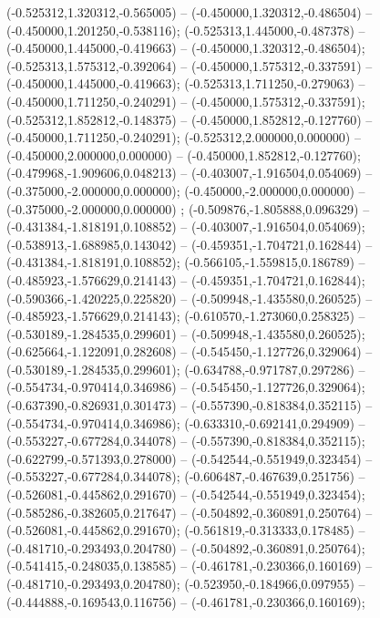  (-0.525312,1.320312,-0.565005) -- (-0.450000,1.320312,-0.486504) -- (-0.450000,1.201250,-0.538116);
 (-0.525313,1.445000,-0.487378) -- (-0.450000,1.445000,-0.419663) -- (-0.450000,1.320312,-0.486504);
 (-0.525313,1.575312,-0.392064) -- (-0.450000,1.575312,-0.337591) -- (-0.450000,1.445000,-0.419663);
 (-0.525313,1.711250,-0.279063) -- (-0.450000,1.711250,-0.240291) -- (-0.450000,1.575312,-0.337591);
 (-0.525312,1.852812,-0.148375) -- (-0.450000,1.852812,-0.127760) -- (-0.450000,1.711250,-0.240291);
 (-0.525312,2.000000,0.000000) -- (-0.450000,2.000000,0.000000) -- (-0.450000,1.852812,-0.127760);
 (-0.479968,-1.909606,0.048213) -- (-0.403007,-1.916504,0.054069) -- (-0.375000,-2.000000,0.000000);
 (-0.450000,-2.000000,0.000000) -- (-0.375000,-2.000000,0.000000) ;
 (-0.509876,-1.805888,0.096329) -- (-0.431384,-1.818191,0.108852) -- (-0.403007,-1.916504,0.054069);
 (-0.538913,-1.688985,0.143042) -- (-0.459351,-1.704721,0.162844) -- (-0.431384,-1.818191,0.108852);
 (-0.566105,-1.559815,0.186789) -- (-0.485923,-1.576629,0.214143) -- (-0.459351,-1.704721,0.162844);
 (-0.590366,-1.420225,0.225820) -- (-0.509948,-1.435580,0.260525) -- (-0.485923,-1.576629,0.214143);
 (-0.610570,-1.273060,0.258325) -- (-0.530189,-1.284535,0.299601) -- (-0.509948,-1.435580,0.260525);
 (-0.625664,-1.122091,0.282608) -- (-0.545450,-1.127726,0.329064) -- (-0.530189,-1.284535,0.299601);
 (-0.634788,-0.971787,0.297286) -- (-0.554734,-0.970414,0.346986) -- (-0.545450,-1.127726,0.329064);
 (-0.637390,-0.826931,0.301473) -- (-0.557390,-0.818384,0.352115) -- (-0.554734,-0.970414,0.346986);
 (-0.633310,-0.692141,0.294909) -- (-0.553227,-0.677284,0.344078) -- (-0.557390,-0.818384,0.352115);
 (-0.622799,-0.571393,0.278000) -- (-0.542544,-0.551949,0.323454) -- (-0.553227,-0.677284,0.344078);
 (-0.606487,-0.467639,0.251756) -- (-0.526081,-0.445862,0.291670) -- (-0.542544,-0.551949,0.323454);
 (-0.585286,-0.382605,0.217647) -- (-0.504892,-0.360891,0.250764) -- (-0.526081,-0.445862,0.291670);
 (-0.561819,-0.313333,0.178485) -- (-0.481710,-0.293493,0.204780) -- (-0.504892,-0.360891,0.250764);
 (-0.541415,-0.248035,0.138585) -- (-0.461781,-0.230366,0.160169) -- (-0.481710,-0.293493,0.204780);
 (-0.523950,-0.184966,0.097955) -- (-0.444888,-0.169543,0.116756) -- (-0.461781,-0.230366,0.160169);
